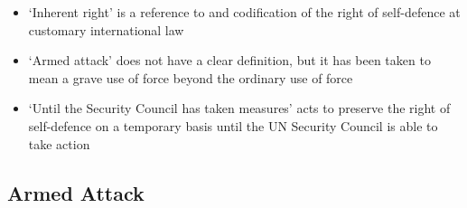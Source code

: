 \begin{itemize}
    \item `Inherent right' is a reference to and codification of the right of self-defence at customary international law
    \item `Armed attack' does not have a clear definition, but it has been taken to mean a grave use of force beyond the ordinary use of force
    \item `Until the Security Council has taken measures' acts to preserve the right of self-defence on a temporary basis until the UN Security Council is able to take action
\end{itemize}

\subsection{Armed Attack}
